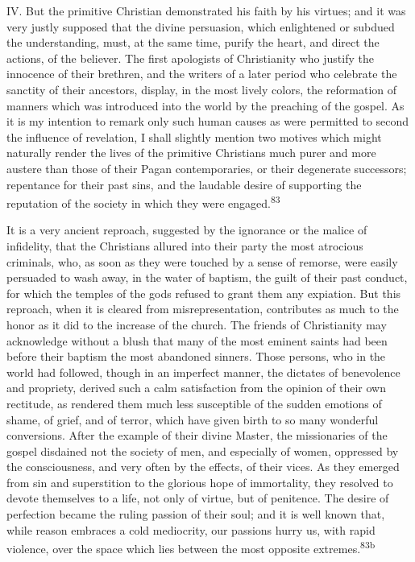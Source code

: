 IV. But the primitive Christian demonstrated his faith by his
virtues; and it was very justly supposed that the divine
persuasion, which enlightened or subdued the understanding, must,
at the same time, purify the heart, and direct the actions, of
the believer. The first apologists of Christianity who justify
the innocence of their brethren, and the writers of a later
period who celebrate the sanctity of their ancestors, display, in
the most lively colors, the reformation of manners which was
introduced into the world by the preaching of the gospel. As it
is my intention to remark only such human causes as were
permitted to second the influence of revelation, I shall slightly
mention two motives which might naturally render the lives of the
primitive Christians much purer and more austere than those of
their Pagan contemporaries, or their degenerate successors;
repentance for their past sins, and the laudable desire of
supporting the reputation of the society in which they were
engaged.\textsuperscript{83}


It is a very ancient reproach, suggested by the ignorance or the
malice of infidelity, that the Christians allured into their
party the most atrocious criminals, who, as soon as they were
touched by a sense of remorse, were easily persuaded to wash
away, in the water of baptism, the guilt of their past conduct,
for which the temples of the gods refused to grant them any
expiation. But this reproach, when it is cleared from
misrepresentation, contributes as much to the honor as it did to
the increase of the church. The friends of Christianity may
acknowledge without a blush that many of the most eminent saints
had been before their baptism the most abandoned sinners. Those
persons, who in the world had followed, though in an imperfect
manner, the dictates of benevolence and propriety, derived such a
calm satisfaction from the opinion of their own rectitude, as
rendered them much less susceptible of the sudden emotions of
shame, of grief, and of terror, which have given birth to so many
wonderful conversions. After the example of their divine Master,
the missionaries of the gospel disdained not the society of men,
and especially of women, oppressed by the consciousness, and very
often by the effects, of their vices. As they emerged from sin
and superstition to the glorious hope of immortality, they
resolved to devote themselves to a life, not only of virtue, but
of penitence. The desire of perfection became the ruling passion
of their soul; and it is well known that, while reason embraces a
cold mediocrity, our passions hurry us, with rapid violence, over
the space which lies between the most opposite extremes.\textsuperscript{83b}

